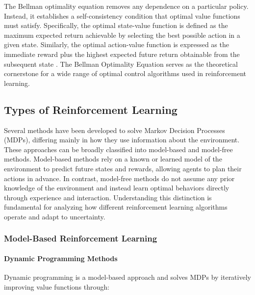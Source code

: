 \documentclass[12pt,a4paper]{report}
\begin{document}
The Bellman optimality equation removes any dependence on a particular policy. 
Instead, it establishes a self-consistency condition that optimal value functions 
must satisfy. Specifically, the optimal state-value 
function is defined as the maximum expected return achievable by selecting the 
best possible action in a given state. Similarly, the optimal action-value function 
is expressed as the immediate reward plus the highest expected future return 
obtainable from the subsequent state \cite{chiave44}.
The Bellman Optimality Equation serves as the theoretical cornerstone for a wide 
range of optimal control algorithms used in reinforcement learning.

\subsection{Types of Reinforcement Learning}
Several methods have been developed to solve Markov Decision Processes (MDPs), differing mainly in how they use information about the environment. These approaches can be broadly classified into model-based and model-free methods. Model-based methods rely on a known or learned model of the environment to predict future states and rewards, allowing agents to plan their actions in advance. In contrast, model-free methods do not assume any prior knowledge of the environment and instead learn optimal behaviors directly through experience and interaction. Understanding this distinction is fundamental for analyzing how different reinforcement learning algorithms operate and adapt to uncertainty.
\subsubsection{Model-Based Reinforcement Learning}
\paragraph{Dynamic Programming Methods}

Dynamic programming is a model-based approach and solves MDPs by iteratively 
improving value functions through:
\end{document}
